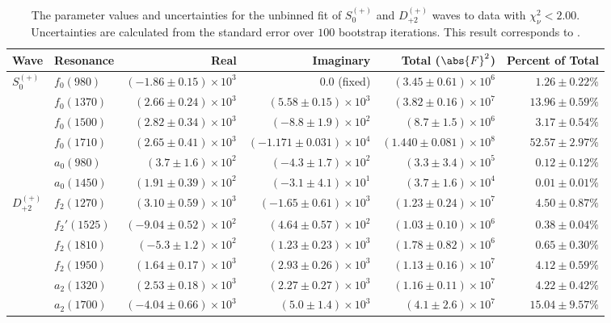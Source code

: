 \begin{table}[ht]
    \begin{center}
        \begin{tabular}{llrrrr}\toprule
        Wave & Resonance & Real & Imaginary & Total ($\abs{F}^2$) & Percent of Total \\\midrule
$S_{0}^{(+)}$ & $f_{0}(980)$ & $(-1.86 \pm 0.15) \times 10^{3}$ & $0.0$ (fixed) & $(3.45 \pm 0.61) \times 10^{6}$ & $1.26 \pm 0.22 \%$ \\
 & $f_{0}(1370)$ & $(2.66 \pm 0.24) \times 10^{3}$ & $(5.58 \pm 0.15) \times 10^{3}$ & $(3.82 \pm 0.16) \times 10^{7}$ & $13.96 \pm 0.59 \%$ \\
 & $f_{0}(1500)$ & $(2.82 \pm 0.34) \times 10^{3}$ & $(-8.8 \pm 1.9) \times 10^{2}$ & $(8.7 \pm 1.5) \times 10^{6}$ & $3.17 \pm 0.54 \%$ \\
 & $f_{0}(1710)$ & $(2.65 \pm 0.41) \times 10^{3}$ & $(-1.171 \pm 0.031) \times 10^{4}$ & $(1.440 \pm 0.081) \times 10^{8}$ & $52.57 \pm 2.97 \%$ \\
 & $a_{0}(980)$ & $(3.7 \pm 1.6) \times 10^{2}$ & $(-4.3 \pm 1.7) \times 10^{2}$ & $(3.3 \pm 3.4) \times 10^{5}$ & $0.12 \pm 0.12 \%$ \\
 & $a_{0}(1450)$ & $(1.91 \pm 0.39) \times 10^{2}$ & $(-3.1 \pm 4.1) \times 10^{1}$ & $(3.7 \pm 1.6) \times 10^{4}$ & $0.01 \pm 0.01 \%$ \\
$D_{+2}^{(+)}$ & $f_{2}(1270)$ & $(3.10 \pm 0.59) \times 10^{3}$ & $(-1.65 \pm 0.61) \times 10^{3}$ & $(1.23 \pm 0.24) \times 10^{7}$ & $4.50 \pm 0.87 \%$ \\
 & $f_{2}'(1525)$ & $(-9.04 \pm 0.52) \times 10^{2}$ & $(4.64 \pm 0.57) \times 10^{2}$ & $(1.03 \pm 0.10) \times 10^{6}$ & $0.38 \pm 0.04 \%$ \\
 & $f_{2}(1810)$ & $(-5.3 \pm 1.2) \times 10^{2}$ & $(1.23 \pm 0.23) \times 10^{3}$ & $(1.78 \pm 0.82) \times 10^{6}$ & $0.65 \pm 0.30 \%$ \\
 & $f_{2}(1950)$ & $(1.64 \pm 0.17) \times 10^{3}$ & $(2.93 \pm 0.26) \times 10^{3}$ & $(1.13 \pm 0.16) \times 10^{7}$ & $4.12 \pm 0.59 \%$ \\
 & $a_{2}(1320)$ & $(2.53 \pm 0.18) \times 10^{3}$ & $(2.27 \pm 0.27) \times 10^{3}$ & $(1.16 \pm 0.11) \times 10^{7}$ & $4.22 \pm 0.42 \%$ \\
 & $a_{2}(1700)$ & $(-4.04 \pm 0.66) \times 10^{3}$ & $(5.0 \pm 1.4) \times 10^{3}$ & $(4.1 \pm 2.6) \times 10^{7}$ & $15.04 \pm 9.57 \%$ \\\bottomrule
        \end{tabular}
    \caption{The parameter values and uncertainties for the unbinned fit of $S_{0}^{(+)}$ and $D_{+2}^{(+)}$ waves to data with $\chi^2_\nu < 2.00$. Uncertainties are calculated from the standard error over $100$ bootstrap iterations. This result corresponds to .}\label{tab:unbinned-fit-chisqdof-2.0-Sp0p-Dp2p}
    \end{center}
\end{table}
